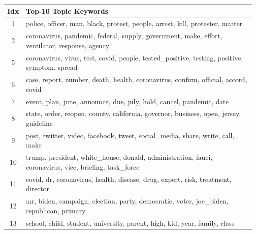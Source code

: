 \documentclass[11pt]{article}
\begin{document}
\begin{table}[ht]
\begin{small}
\begin{tabular}{c|l}
\hline
Idx & Top-10 Topic Keywords                                                                                         \\ \hline
1           & police, officer, man, black, protest, people, arrest, kill, protester, matter                           \\
2           & coronavirus, pandemic, federal, supply, government, make, effort, ventilator, response, agency          \\
5           & coronavirus, virus, test, covid, people, tested\_positive, testing, positive, symptom, spread           \\
6           & case, report, number, death, health, coronavirus, confirm, official, accord, covid                      \\
7           & event, plan, june, announce, due, july, hold, cancel, pandemic, date                                    \\
8           & state, order, reopen, county, california, governor, business, open, jersey, guideline                   \\
9           & post, twitter, video, facebook, tweet, social\_media, share, write, call, make                          \\
10          & trump, president, white\_house, donald, administration, fauci, coronavirus, vice, briefing, task\_force \\
11          & covid, dr, coronavirus, health, disease, drug, expert, risk, treatment, director                        \\
12          & mr, biden, campaign, election, party, democratic, voter, joe\_biden, republican, primary                \\
13          & school, child, student, university, parent, high, kid, year, family, class                              \\

\end{tabular}
\end{small}
\end{table}
\end{document}
